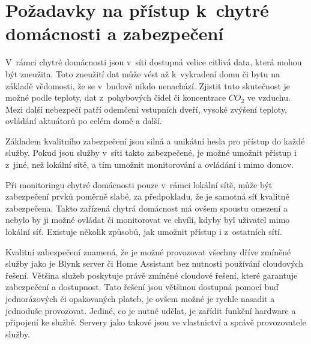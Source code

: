



\section{Požadavky na přístup k~chytré domácnosti a zabezpečení} \label{smart-home-access}
V~rámci chytré domácnosti jsou v~síti dostupná velice citlivá data, která mohou být zneužita. Toto zneužití dat může vést až k~vykradení domu či bytu na základě vědomosti, že se v~budově nikdo nenachází. Zjistit tuto skutečnost je možné podle teploty, dat z~pohybových čidel či koncentrace $CO_2$ ve vzduchu. Mezi další nebezpečí patří odemčení vstupních dveří, vysoké zvýšení teploty, ovládání aktuátorů po celém domě a další.

Základem kvalitního zabezpečení jsou silná a unikátní hesla pro přístup do každé služby. Pokud jsou služby v~síti takto zabezpečené, je možné umožnit přístup i z~jiné, než lokální sítě, a tím umožnit monitorování a ovládání i mimo domov. 

Při monitoringu chytré domácnosti pouze v~rámci lokální sítě, může být zabezpečení prvků poměrně slabé, za předpokladu, že je samotná síť kvalitně zabezpečena. Takto zařízená chytrá domácnost má ovšem spoustu omezení a nebylo by ji možné ovládat či monitorovat ve chvíli, kdyby byl uživatel mimo lokální síť. Existuje několik způsobů, jak umožnit přístup i z~ostatních sítí.

Kvalitní zabezpečení znamená, že je možné provozovat všechny dříve zmíněné služby jako je Blynk server či Home Assistant bez nutnosti používání cloudových řešení. Většina služeb poskytuje právě zmíněné cloudové řešení, které garantuje zabezpečení a dostupnost. Tato řešení jsou většinou dostupná pomocí buď jednorázových či opakovaných plateb, je ovšem možné je rychle nasadit a jednoduše provozovat. Jediné, co je nutné udělat, je zařídit funkční hardware a připojení ke službě. Servery jako takové jsou ve vlastnictví a správě provozovatele služby.

